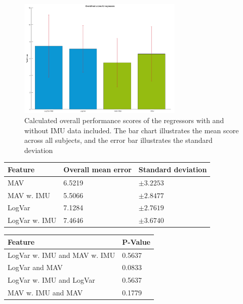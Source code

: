 \begin{figure}[H]
	\includegraphics[width=0.7\textwidth]{figures/results/allRegressorBarzTimeScoreForTargetTest}  %
	\caption{Calculated overall performance scores of the regressors with and without IMU data included. The bar chart illustrates the mean score across all subjects, and the error bar illustrates the standard deviation}
	\label{fig:gotItTimeOverall}  %
\end{figure}

\begin{center}
	\begin{tabular}{l l l}
		\toprule
		\textbf{Feature} & \textbf{Overall mean error} & \textbf{Standard deviation}\\
		\midrule
		MAV & 6.5219 & $\pm 3.2253$ \\
		MAV w. IMU & 5.5066 & $\pm 2.8477$ \\
		LogVar & 7.1284 & $\pm 2.7619$ \\
		LogVar w. IMU & 7.4646 & $\pm 3.6740$ \\
		\bottomrule
	\end{tabular}
\end{center}

\begin{center}
	\begin{tabular}{l l}
		\toprule
		\textbf{Feature} & \textbf{P-Value}\\
		\midrule
		LogVar w. IMU and MAV w. IMU & 0.5637 \\
		LogVar and MAV & 0.0833 \\
		LogVar w. IMU and LogVar & 0.5637 \\
		MAV w. IMU and MAV & 0.1779 \\
		\bottomrule
	\end{tabular}
\end{center}


